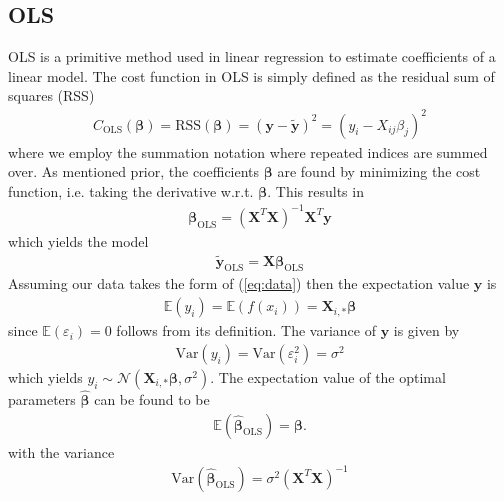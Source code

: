 \documentclass[%
reprint,
amsmath,amssymb,
aps,
pra,
]{revtex4-2}
\begin{document}
\subsection{OLS}
OLS is a primitive method used in linear regression to estimate coefficients of a linear model. The cost function in OLS is simply defined as the residual sum of squares (RSS)
\begin{align*}
	C_\text{OLS}(\bm\beta)=\text{RSS}(\bm\beta)=(\bm y-\tilde{\bm y})^2=(y_i-X_{ij}\beta_j)^2
\end{align*}
where we employ the summation notation where repeated indices are summed over. As mentioned prior, the coefficients $\bm\beta$ are found by minimizing the cost function, i.e. taking the derivative w.r.t. $\bm\beta$. This results in
\begin{align*}
	\bm\beta_\text{OLS}=(\bm X^T\bm X)^{-1}\bm X^T\bm y
\end{align*}
which yields the model
\begin{align}
	\tilde{\bm y}_\text{OLS}=\bm X\bm \beta_\text{OLS}
\end{align}
Assuming our data takes the form of (\ref{eq:data}) then the expectation value $\bm y$ is
\begin{align*}
	\mathbb{E}(y_i)=\mathbb{E}(f(x_i))=\bm X_{i,*}\bm\beta
\end{align*}
since $\mathbb{E}(\varepsilon_i)=0$ follows from its definition. The variance of $\bm y$ is given by
\begin{align*}
	\text{Var}(y_i)=\text{Var}(\varepsilon_i^2)=\sigma^2
\end{align*}
which yields $y_i\sim\mathcal{N}(\bm X_{i,*}\bm\beta,\sigma^2)$. The expectation value of the optimal parameters $\hat{\bm\beta}$ can be found to be
\begin{align*}
	\mathbb{E}(\hat{\bm\beta}_\text{OLS})=\bm\beta.
\end{align*}
with the variance
\begin{align*}
	\text{Var}(\hat{\bm\beta}_\text{OLS})=\sigma^2(\bm X^T \bm X)^{-1}
\end{align*}
\end{document}
